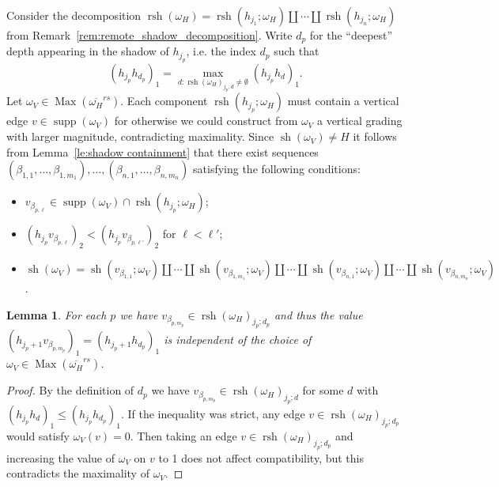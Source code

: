 \documentclass{amsart}
\newtheorem{lemma}[theorem]{Lemma}
\newcommand{\supp}{\operatorname{supp}}
\newcommand{\Max}{\operatorname{Max}}
\newcommand{\rsh}{\operatorname{rsh}}
\newcommand{\sh}{\operatorname{sh}}
\begin{document}
 Consider the decomposition $\rsh(\omega_H)=\rsh(h_{j_1};\omega_H)\amalg\cdots\amalg\rsh(h_{j_n};\omega_H)$ from Remark~\ref{rem:remote_shadow_decomposition}.  Write $d_p$ for the ``deepest'' depth appearing in the shadow of $h_{j_p}$, i.e. the index $d_p$ such that 
 \[(h_{j_p}h_{d_p})_1=\max\limits_{d:\rsh(\omega_H)_{j_p;d}\ne\emptyset}(h_{j_p}h_d)_1.\]
 Let $\omega_V\in\Max(\overline{\omega_H}^{rs})$.  Each component $\rsh(h_{j_p};\omega_H)$ must contain a vertical edge $v\in\supp(\omega_V)$ for otherwise we could construct from $\omega_V$ a vertical grading with larger magnitude, contradicting maximality.  Since $\sh(\omega_V)\ne H$ it follows from Lemma~\ref{le:shadow containment} that there exist sequences $(\beta_{1,1},\ldots,\beta_{1,m_1}),\ldots,(\beta_{n,1},\ldots,\beta_{n,m_n})$ satisfying the following conditions:
 \begin{itemize}
  \item $v_{\beta_{p,\ell}}\in\supp(\omega_V)\cap\rsh(h_{j_p};\omega_H)$;
  \item $(h_{j_p}v_{\beta_{p,\ell}})_2<(h_{j_p}v_{\beta_{p,\ell'}})_2$ for $\ell<\ell'$;
  \item $\sh(\omega_V)=\sh(v_{\beta_{1,1}};\omega_V)\amalg\cdots\amalg\sh(v_{\beta_{1,m_1}};\omega_V)\amalg\cdots\amalg\sh(v_{\beta_{n,1}};\omega_V)\amalg\cdots\amalg\sh(v_{\beta_{n,m_n}};\omega_V)$.
 \end{itemize}
 \begin{lemma}
  For each $p$ we have $v_{\beta_{p,m_p}}\in\rsh(\omega_H)_{j_p;d_p}$ and thus the value $(h_{j_p+1}v_{\beta_{p,m_p}})_1=(h_{j_p+1}h_{d_p})_1$ is independent of the choice of $\omega_V\in\Max(\overline{\omega_H}^{rs})$.
 \end{lemma}
 \begin{proof}
  By the definition of $d_p$ we have $v_{\beta_{p,m_p}}\in\rsh(\omega_H)_{j_p;d}$ for some $d$ with $(h_{j_p}h_d)_1\le(h_{j_p}h_{d_p})_1$.  If the inequality was strict, any edge $v\in\rsh(\omega_H)_{j_p;d_p}$ would satisfy $\omega_V(v)=0$.  Then taking an edge $v\in\rsh(\omega_H)_{j_p;d_p}$ and increasing the value of $\omega_V$ on $v$ to 1 does not affect compatibility, but this contradicts the maximality of $\omega_V$.
 \end{proof}
  
\end{document}

